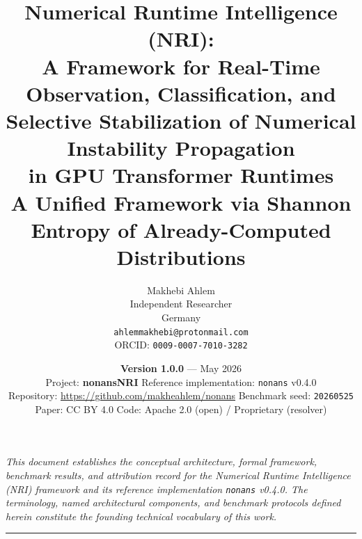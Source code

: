 \documentclass[11pt,a4paper]{article}
\title{%
  \textbf{Numerical Runtime Intelligence (NRI):}\\
  \textbf{A Framework for Real-Time Observation, Classification, and}\\
  \textbf{Selective Stabilization of Numerical Instability Propagation}\\
  \textbf{in GPU Transformer Runtimes}\\[6pt]
  \large A Unified Framework via Shannon Entropy of Already-Computed
  Distributions
}
\author{%
  Makhebi Ahlem\\[2pt]
  \small Independent Researcher\\
  \small Germany\\
  \small \texttt{ahlemmakhebi@protonmail.com}\\[4pt]
  \small ORCID: \texttt{0009-0007-7010-3282}
}
\date{%
  \textbf{Version 1.0.0} --- May 2026\\[2pt]
  \small Project: \textbf{nonansNRI} \quad
  Reference implementation: \texttt{nonans} v0.4.0\\
  \small Repository: \url{https://github.com/makheahlem/nonans} \quad
  Benchmark seed: \texttt{20260525}\\
  \small Paper: CC BY 4.0 \quad Code: Apache 2.0 (open) / Proprietary (resolver)
}
\theoremstyle{plain}
\begin{document}
\maketitle
\thispagestyle{fancy}


\begin{center}
\small\textit{%
  This document establishes the conceptual architecture, formal framework,
  benchmark results, and attribution record for the Numerical Runtime
  Intelligence (NRI) framework and its reference implementation
  \texttt{nonans} v0.4.0.
  The terminology, named architectural components, and benchmark protocols
  defined herein constitute the founding technical vocabulary of this work.
}
\end{center}

\hrule
\vspace{8pt}

\end{document}
